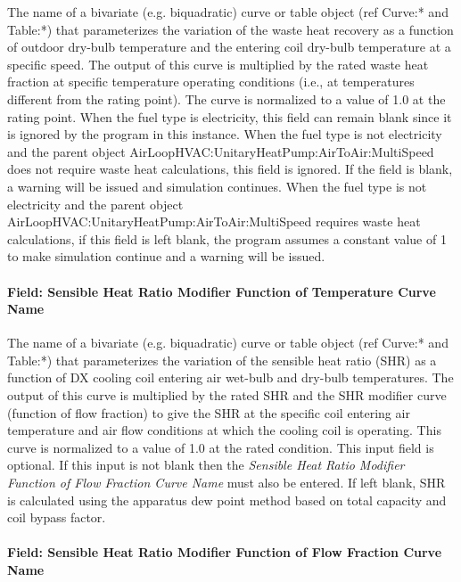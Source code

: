 The name of a bivariate (e.g. biquadratic) curve or table object (ref Curve:* and Table:*) that parameterizes the variation of the waste heat recovery as a function of outdoor dry-bulb temperature and the entering coil dry-bulb temperature at a specific speed. The output of this curve is multiplied by the rated waste heat fraction at specific temperature operating conditions (i.e., at temperatures different from the rating point). The curve is normalized to a value of 1.0 at the rating point. When the fuel type is electricity, this field can remain blank since it is ignored by the program in this instance. When the fuel type is not electricity and the parent object AirLoopHVAC:UnitaryHeatPump:AirToAir:MultiSpeed does not require waste heat calculations, this field is ignored. If the field is blank, a warning will be issued and simulation continues. When the fuel type is not electricity and the parent object AirLoopHVAC:UnitaryHeatPump:AirToAir:MultiSpeed requires waste heat calculations, if this field is left blank, the program assumes a constant value of 1 to make simulation continue and a warning will be issued.

\paragraph{Field: Sensible Heat Ratio Modifier Function of Temperature Curve Name}

The name of a bivariate (e.g. biquadratic) curve or table object (ref Curve:* and Table:*) that parameterizes the variation of the sensible heat ratio (SHR) as a function of DX cooling coil entering air wet-bulb and dry-bulb temperatures. The output of this curve is multiplied by the rated SHR and the SHR modifier curve (function of flow fraction) to give the SHR at the specific coil entering air temperature and air flow conditions at which the cooling coil is operating. This curve is normalized to a value of 1.0 at the rated condition. This input field is optional. If this input is not blank then the \textit{Sensible Heat Ratio Modifier Function of Flow Fraction Curve Name} must also be entered. If left blank, SHR is calculated using the apparatus dew point method based on total capacity and coil bypass factor.

\paragraph{Field: Sensible Heat Ratio Modifier Function of Flow Fraction Curve Name}

